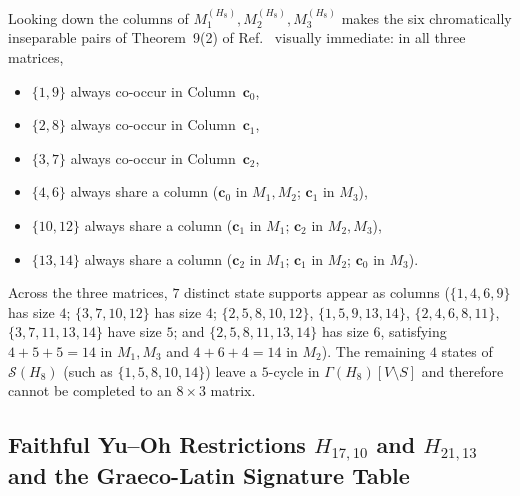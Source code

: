 \documentclass[aps,pra,reprint,superscriptaddress,longbibliography,nofootinbib,floatfix,10pt]{revtex4-2}
\theoremstyle{definition}\newtheorem{definition}[theorem]{Definition}
\theoremstyle{remark}\newtheorem{remark}[theorem]{Remark}
\newcommand{\Sc}{\mathcal S}\newcommand{\Cc}{\mathcal C}
\begin{document}
Looking down the columns of $M_1^{(H_8)},M_2^{(H_8)},M_3^{(H_8)}$ makes the six chromatically inseparable pairs of Theorem~9(2) of Ref.~\cite{svozil-2025-color} visually immediate: in all three matrices,
\begin{itemize}
\item $\{1,9\}$ always co-occur in Column~$\mathbf{c}_0$,
\item $\{2,8\}$ always co-occur in Column~$\mathbf{c}_1$,
\item $\{3,7\}$ always co-occur in Column~$\mathbf{c}_2$,
\item $\{4,6\}$ always share a column ($\mathbf{c}_0$ in $M_1,M_2$; $\mathbf{c}_1$ in $M_3$),
\item $\{10,12\}$ always share a column ($\mathbf{c}_1$ in $M_1$; $\mathbf{c}_2$ in $M_2,M_3$),
\item $\{13,14\}$ always share a column ($\mathbf{c}_2$ in $M_1$; $\mathbf{c}_1$ in $M_2$; $\mathbf{c}_0$ in $M_3$).
\end{itemize}
Across the three matrices, $7$ distinct state supports appear as columns ($\{1,4,6,9\}$ has size $4$; $\{3,7,10,12\}$ has size $4$; $\{2,5,8,10,12\}$, $\{1,5,9,13,14\}$, $\{2,4,6,8,11\}$, $\{3,7,11,13,14\}$ have size $5$; and $\{2,5,8,11,13,14\}$ has size $6$, satisfying $4+5+5=14$ in $M_1,M_3$ and $4+6+4=14$ in $M_2$). The remaining $4$ states of $\Sc(H_8)$ (such as $\{1,5,8,10,14\}$) leave a $5$-cycle in $\Gamma(H_8)[V\setminus S]$ and therefore cannot be completed to an $8\times 3$ matrix.

\subsection{Faithful Yu--Oh Restrictions \texorpdfstring{$H_{17,10}$ and $H_{21,13}$}{H17,10 and H21,13} and the Graeco-Latin Signature Table}\label{sec:H17-H21}
\end{document}
